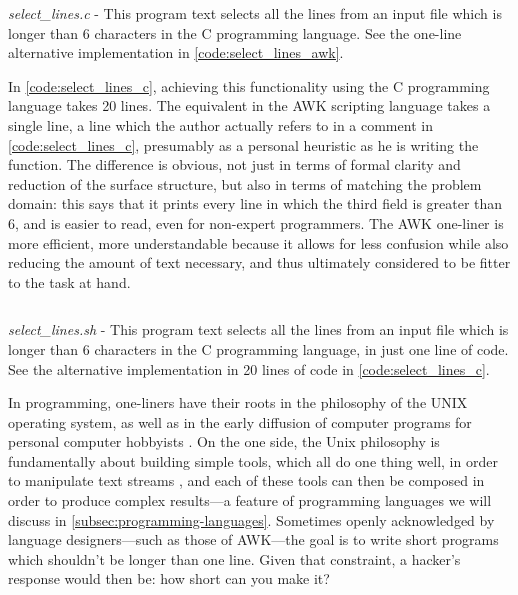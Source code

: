 \begin{listing}
  \inputminted{cpp}{./corpus/select_lines.c}
  \caption{\emph{select\_lines.c} - This program text selects all the lines from an input file which is longer than 6 characters in the C programming language. See the one-line alternative implementation in \autoref{code:select_lines_awk}.}
  \label{code:select_lines_c}
\end{listing}

In \autoref{code:select_lines_c}, achieving this functionality  using the C programming language takes 20 lines. The equivalent in the AWK scripting language takes a single line, a line which the author actually refers to in a comment in \autoref{code:select_lines_c}, presumably as a personal heuristic as he is writing the function. The difference is obvious, not just in terms of formal clarity and reduction of the surface structure, but also in terms of matching the problem domain: this says that it prints every line in which the third field is greater than 6, and is easier to read, even for non-expert programmers. The AWK one-liner is more efficient, more understandable because it allows for less confusion while also reducing the amount of text necessary, and thus ultimately considered to be fitter to the task at hand.

\begin{listing}
  \inputminted{bash}{./corpus/select_lines.sh}
  \caption{\emph{select\_lines.sh} - This program text selects all the lines from an input file which is longer than 6 characters in the C programming language, in just one line of code. See the alternative implementation in 20 lines of code in \autoref{code:select_lines_c}.}
  \label{code:select_lines_awk}
\end{listing}

In programming, one-liners have their roots in the philosophy of the UNIX operating system, as well as in the early diffusion of computer programs for personal computer hobbyists \citep{montfort_10_2014}. On the one side, the Unix philosophy is fundamentally about building simple tools, which all do one thing well, in order to manipulate text streams \citep{raymond_art_2003}, and each of these tools can then be composed in order to produce complex results—a feature of programming languages we will discuss in \autoref{subsec:programming-languages}. Sometimes openly acknowledged by language designers—such as those of AWK—the goal is to write short programs which shouldn't be longer than one line. Given that constraint, a hacker's response would then be: how short can you make it?

